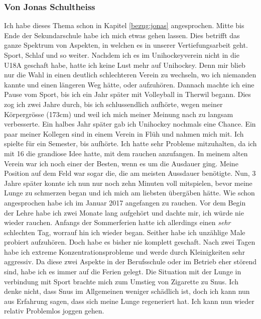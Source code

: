 \subsubsection{Von Jonas Schultheiss}
\label{vorher_jonas}
Ich habe dieses Thema schon in Kapitel \ref{bezug:jonas} angesprochen.
\newline
Mitte bis Ende der Sekundarschule habe ich mich etwas gehen lassen. Dies betrifft das ganze Spektrum von Aspekten, in welchen es in unserer Vertiefungsarbeit geht. Sport, Schlaf und so weiter. Nachdem ich es im Unihockeyverein nicht in die U18A geschaft habe, hatte ich keine Lust mehr auf Unihockey. Denn mir blieb nur die Wahl in einen deutlich schlechteren Verein zu wechseln, wo ich niemanden kannte und einen längeren Weg hätte, oder aufzuhören. Dannach machte ich eine Pause vom Sport, bis ich ein Jahr später mit Volleyball in Therwil begann. Dies zog ich zwei Jahre durch, bis ich schlussendlich aufhörte, wegen meiner Körpergrösse (173cm) und weil ich mich meiner Meinung nach zu langsam verbesserte. Ein halbes Jahr später gab ich Unihockey nochmals eine Chance. Ein paar meiner Kollegen sind in einem Verein in Flüh und nahmen mich mit. Ich spielte für ein Semester, bis aufhörte. Ich hatte sehr Probleme mitzuhalten, da ich mit 16 die grandiose Idee hatte, mit dem rauchen anzufangen. In meinem alten Verein war ich noch einer der Besten, wenn es um die Ausdauer ging. Meine Position auf dem Feld war sogar die, die am meisten Aussdauer benötigte. Nun, 3 Jahre später konnte ich nun nur noch zehn Minuten voll mitspielen, bevor meine Lunge zu schmerzen began und ich mich am liebsten übergäben hätte.
\newline
Wie schon angesprochen habe ich im Januar 2017 angefangen zu rauchen. Vor dem Begin der Lehre habe ich zwei Monate lang aufgehört und dachte mir, ich würde nie wieder rauchen. Anfangs der Sommerferien hatte ich allerdings einen \textit{sehr} schlechten Tag, worrauf hin ich wieder began. Seither habe ich unzählige Male probiert aufzuhören. Doch habe es bisher nie komplett geschaft. Nach zwei Tagen habe ich extreme Konzentrationsprobleme und werde durch Kleinigkeiten sehr aggressiv. Da diese zwei Aspekte in der Berufsschule oder im Betrieb eher störend sind, habe ich es immer auf die Ferien gelegt. Die Situation mit der Lunge in verbindung mit Sport brachte mich zum Umstieg von Zigarette zu Snus. Ich denke nicht, dass Snus im Allgemeinen weniger schädlich ist, doch ich kann nun aus Erfahrung sagen, dass sich meine Lunge regeneriert hat. Ich kann nun wieder relativ Problemlos joggen gehen.
